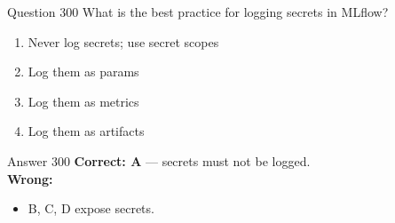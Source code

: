 \documentclass[aspectratio=169,11pt]{beamer}
\begin{document}
	\begin{frame}{Question 300}
		What is the best practice for logging secrets in MLflow?
		\begin{enumerate}[label=\Alph*.]
			\item Never log secrets; use secret scopes
			\item Log them as params
			\item Log them as metrics
			\item Log them as artifacts
		\end{enumerate}
	\end{frame}
	\begin{frame}{Answer 300}
		\textbf{Correct: A} --- secrets must not be logged.\\
		\vspace{0.5em}
		\textbf{Wrong:}
		\begin{itemize}
			\item B, C, D expose secrets.
		\end{itemize}
	\end{frame}
	
\end{document}
